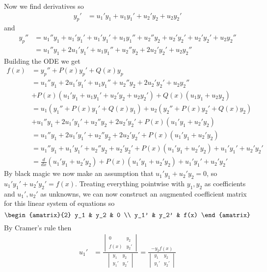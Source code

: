 \documentclass[notes]{subfiles}
\begin{document}
Now we find derivatives so
\begin{align*}
    y_p' &= u_1'y_1 + u_1y_1' + u_2'y_2 + u_2y_2'
\end{align*}
and
\begin{align*}
    y_p''
    &= u_1''y_1 + u_1'y_1' + u_1'y_1' + u_1y_1'' + u_2''y_2 + u_2'y_2' + u_2'y_2' + u_2y_2'' \\
    &= u_1''y_1 + 2u_1'y_1' + u_1y_1'' + u_2''y_2 + 2u_2'y_2' + u_2y_2''
\end{align*}
Building the ODE we get
\begin{align*}
    f(x)
    &= y_p'' + P(x)y_p' + Q(x)y_p \\
    &= u_1''y_1 + 2u_1'y_1' + u_1y_1'' + u_2''y_2 + 2u_2'y_2' + u_2y_2'' \\ &+ P(x)(u_1'y_1 + u_1y_1' + u_2'y_2 + u_2y_2') + Q(x)(u_1y_1 + u_2y_2) \\
    &= u_1(y_1'' + P(x)y_1' + Q(x)y_1) + u_2(y_2'' + P(x)y_2' + Q(x)y_2) \\ &+ u_1''y_1 + 2u_1'y_1' + u_2''y_2 + 2u_2'y_2' + P(x)(u_1'y_1 + u_2'y_2) \\
    &= u_1''y_1 + 2u_1'y_1' + u_2''y_2 + 2u_2'y_2' + P(x)(u_1'y_1 + u_2'y_2) \\
    &= u_1''y_1 + u_1'y_1' + u_2''y_2 + u_2'y_2' + P(x)(u_1'y_1 + u_2'y_2) + u_1'y_1' + u_2'y_2' \\
    &= \frac{d}{dx}(u_1'y_1 + u_2'y_2) + P(x)(u_1'y_1 + u_2'y_2) + u_1'y_1' + u_2'y_2'
\end{align*}
By black magic we now make an assumption that $u_1'y_1 + u_2'y_2 = 0$, so $u_1'y_1' + u_2'y_2' = f(x)$. Treating everything pointwise with $y_1, y_2$ as coefficients and $u_1', u_2'$ as unknowns, we can now construct an augmented coefficient matrix for this linear system of equations so
\[
    \begin{amatrix}{2}
        y_1 & y_2 & 0 \\
        y_1' & y_2' & f(x)
    \end{amatrix}
\]
By Cramer's rule then
\begin{align*}
    u_1'
    &= \frac{\begin{vmatrix}
        0 & y_2 \\
        f(x) & y_2'
    \end{vmatrix}}{\begin{vmatrix}
        y_1 & y_2 \\
        y_1' & y_2'
    \end{vmatrix}}
    = \frac{-y_2f(x)}{\begin{vmatrix}
        y_1 & y_2 \\
        y_1' & y_2'
    \end{vmatrix}}
\end{align*}
\end{document}

